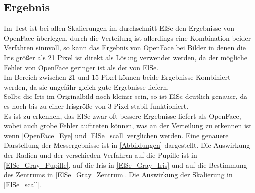 \subsection{Ergebnis}
Im Test ist bei allen Skalierungen im durchschnitt ElSe den Ergebnisse von OpenFace überlegen, durch die Verteilung ist allerdings eine Kombination beider Verfahren sinnvoll, so kann das Ergebnis von OpenFace bei Bilder in denen die Iris größer als 21 Pixel ist direkt als Lösung verwendet werden, da der mögliche Fehler von OpenFace geringer ist als der von ElSe.\\
Im Bereich zwischen 21 und 15 Pixel können beide Ergebnisse Kombiniert werden, da sie ungefähr gleich gute Ergebnisse liefern.\\
Sollte die Iris im Originalbild noch kleiner sein, so ist ElSe deutlich genauer, da es noch bis zu einer Irisgröße von 3 Pixel stabil funktioniert.\\
Es ist zu erkennen, das ElSe zwar oft bessere Ergebnisse liefert als OpenFace, wobei auch grobe Fehler auftreten können, was an der Verteilung zu erkennen ist wenn \autoref{OpenFace_Eye} und \autoref{ElSe_scall} verglichen werden.
Eine genauere Darstellung der Messergebnisse ist in \autoref{Abbildungen} dargestellt. Die Auswirkung der Radien und der verschieden Verfahren auf die Pupille ist in \autoref{ElSe_Gray_Pupille}, auf die Iris in \autoref{ElSe_Gray_Iris} und auf die Bestimmung des Zentrums in \autoref{ElSe_Gray_Zentrum}. Die Auswirkung der Skalierung in \autoref{ElSe_scall}.